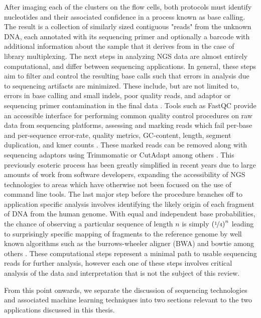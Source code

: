 After imaging each of the clusters on the flow cells, both protocols must identify nucleotides and their associated confidence in a process known as base calling. The result is a collection of similarly sized contiguous "reads" from the unknown DNA, each annotated with its sequencing primer and optionally a barcode with additional information about the sample that it derives from in the case of library multiplexing. The next steps in analyzing NGS data are almost entirely computational, and differ between sequencing applications. In general, these steps aim to filter and control the resulting base calls such that errors in analysis due to sequencing artifacts are minimized. These include, but are not limited to, errors in base calling and small \glspl{indel}, poor quality reads, and adaptor or sequencing primer contamination in the final data \cite{Slatko2018}. Tools such as FastQC provide an accessible interface for performing common quality control procedures on raw data from sequencing platforms, assessing and marking reads which fail per-base and per-sequence error-rate, quality metrics, GC-content, length, segment duplication, and kmer counts \cite{Andrews2015}. These marked reads can be removed along with sequencing adaptors using Trimmomatic or CutAdapt among others \cite{Martin2011a,Bolger2014}. This previously esoteric process has been greatly simplified in recent years due to large amounts of work from software developers, expanding the accessibility of NGS technologies to areas which have otherwise not been focused on the use of command line tools. The last major step before the procedure branches off to application specific analysis involves identifying the likely origin of each fragment of DNA from the human genome. With equal and independent base probabilities, the chance of observing a particular sequence of length $n$ is simply $\left( \nicefrac{1}{4} \right)^n$ leading to surprisingly specific mapping of fragments to the reference genome by well known algorithms such as the burrows-wheeler aligner (BWA) and bowtie among others \cite{Langmead2009,Li2009}. These computational steps represent a minimal path to usable sequencing reads for further analysis, however each one of these steps involves critical analysis of the data and interpretation that is not the subject of this review.

From this point onwards, we separate the discussion of sequencing technologies and associated machine learning techniques into two sections relevant to the two applications discussed in this thesis.

